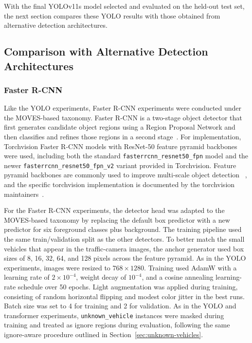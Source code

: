 With the final YOLOv11s model selected and evaluated on the held-out test set, 
the next section compares these YOLO results with those obtained from alternative 
detection architectures.


\subsection{Comparison with Alternative Detection Architectures}

\subsubsection{Faster R-CNN}

Like the YOLO experiments, Faster R-CNN experiments were conducted under the 
MOVES-based taxonomy. Faster R-CNN is a two-stage object detector that first 
generates candidate object regions using a Region Proposal Network and then 
classifies and refines those regions in a second stage~\cite{ren_faster_2015}. 
For implementation, Torchvision Faster R-CNN models with ResNet-50 feature 
pyramid backbones were used, including both the standard 
\verb|fasterrcnn_resnet50_fpn| model and the newer 
\verb|fasterrcnn_resnet50_fpn_v2| variant provided in Torchvision. Feature 
pyramid backbones are commonly used to improve multi-scale object detection
~\cite{lin_feature_2017}, and the specific torchvision implementation is 
documented by the torchvision maintainers~\cite{torchvision2016}.

For the Faster R-CNN experiments, the detector head was adapted to the MOVES-based
taxonomy by replacing the default box predictor with a new predictor for six 
foreground classes plus background. The training pipeline used the same train/validation
split as the other detectors. To better match the small vehicles that appear in the
traffic-camera images, the anchor generator used box sizes of 8, 16, 32, 64, and
128 pixels across the feature pyramid. As in the YOLO experiments, images were
resized to $768 \times 1280$. Training used AdamW with a learning rate of
$2\times10^{-4}$, weight decay of $10^{-4}$, and a cosine annealing learning-rate
schedule over 50 epochs. Light augmentation was applied during training, consisting
of random horizontal flipping and modest color jitter in the best runs. Batch size
was set to 4 for training and 2 for validation. As in the YOLO and transformer
experiments, \verb|unknown_vehicle| instances were masked during training and
treated as ignore regions during evaluation, following the same ignore-aware
procedure outlined in Section~\ref{sec:unknown-vehicles}.


